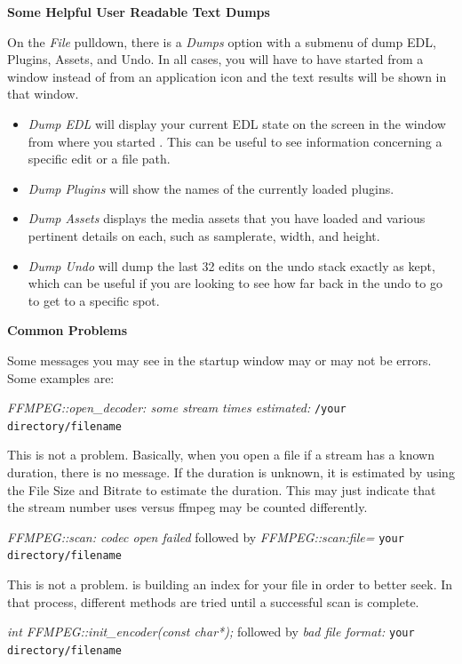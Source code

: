 \textbf{Some Helpful User Readable Text Dumps}

On the \textit{File} pulldown, there is a \textit{Dumps} option with a submenu of dump EDL, Plugins, Assets, and Undo. In all cases, you will have to have started \CGG{} from a window instead of from an application icon and
the text results will be shown in that window.

\begin{itemize}[nosep]
\item \textit{Dump EDL}  will display your current EDL state on the screen in the window from where you started .\CGG{} This can be useful to see information concerning a specific edit or a file path.
\item \textit{Dump Plugins}  will show the names of the currently loaded plugins.
\item \textit{Dump Assets}  displays the media assets that you have loaded and various pertinent details on each, such as samplerate, width, and height.
\item \textit{Dump Undo}  will dump the last 32 edits on the undo stack exactly as kept, which can be useful if you are looking to see how far back in the undo to go to get to a specific spot.
\end{itemize}

\textbf{Common Problems}

Some messages you may see in the startup window may or may not be errors. Some examples are:
\bigskip

\textit{FFMPEG::open\_decoder: some stream times estimated:}  \texttt{/your directory/filename}

This is not a problem. Basically, when you open a file if a stream has a known duration, there is no message. If the duration is unknown, it is estimated by using the File Size and Bitrate to estimate the duration. This may just indicate that the stream number \CGG{} uses versus ffmpeg may be counted differently.
\bigskip

\textit{FFMPEG::scan: codec open failed} followed by
\newline 
\textit{FFMPEG::scan:file=} \quad \texttt{your directory/filename}

This is not a problem. \CGG{} is building an index for your file in order to better seek.  In that process, different methods are tried until a successful scan is complete.
\bigskip

\textit{int FFMPEG::init\_encoder(const char*);} followed by
\newline 
\textit{bad file format:} \quad \texttt{your directory/filename}

